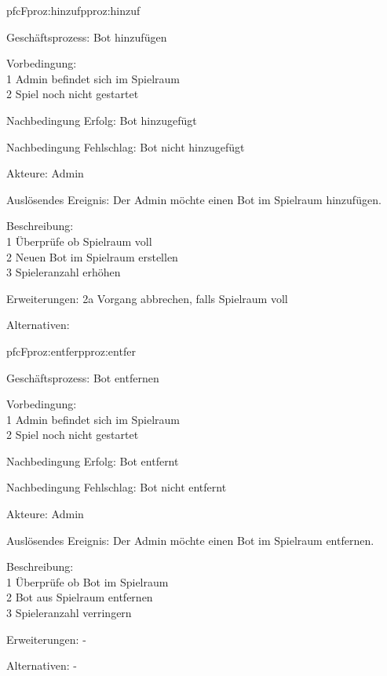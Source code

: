 \begin{description}[leftmargin=3em, style=sameline]
	\begin{php}{pfc}{F}{proz:hinzuf}{pproz:hinzuf}
		\item [Geschäftsprozess:] Bot hinzufügen
		\item [Vorbedingung:]\hfill\\
		1 Admin befindet sich im Spielraum \\
		2 Spiel noch nicht gestartet
		\item [Nachbedingung Erfolg:] Bot hinzugefügt
		\item [Nachbedingung Fehlschlag:] Bot nicht hinzugefügt
		\item [Akteure:] Admin
		\item [Auslösendes Ereignis:] Der Admin möchte einen Bot im Spielraum hinzufügen.
		\item [Beschreibung:]\hfill\\
		1 Überprüfe ob Spielraum voll \\
		2 Neuen Bot im Spielraum erstellen \\
		3 Spieleranzahl erhöhen
		\item [Erweiterungen:] 2a Vorgang abbrechen, falls Spielraum voll
		\item [Alternativen:] 
	\end{php}
	
	\begin{php}{pfc}{F}{proz:entfer}{pproz:entfer}
		\item [Geschäftsprozess:] Bot entfernen
		\item [Vorbedingung:]\hfill\\
		1 Admin befindet sich im Spielraum \\
		2 Spiel noch nicht gestartet \\
		\item [Nachbedingung Erfolg:] Bot entfernt
		\item [Nachbedingung Fehlschlag:] Bot nicht entfernt
		\item [Akteure:] Admin
		\item [Auslösendes Ereignis:] Der Admin möchte einen Bot im Spielraum entfernen.
		\item [Beschreibung:]\hfill\\
		1 Überprüfe ob Bot im Spielraum \\
		2 Bot aus Spielraum entfernen \\
		3 Spieleranzahl verringern
		\item [Erweiterungen:] -
		\item [Alternativen:] -
	\end{php}
	

\end{description}
